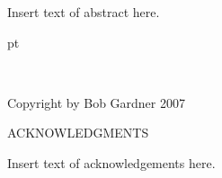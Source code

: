 \documentclass[12pt]{etsu_thesis}
\begin{document}
\noindent 
Insert text of abstract here.

 pt

\newpage

\begin{center}

\ \ \

\vspace{3.in}

Copyright by
Bob Gardner 2007

\end{center}

\newpage





\begin{center}
 ACKNOWLEDGMENTS \\ [.15in]
\end{center}

Insert text of acknowledgements here.



\newpage

\tableofcontents

\newpage

\listoftables


\newpage
\end{document}
